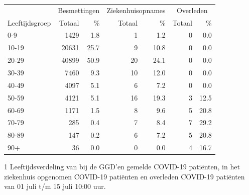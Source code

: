 \documentclass[
  english,
  man,floatsintext]{apa6}
\begin{document}
\begin{table}
\centering\begingroup\fontsize{11}{13}\selectfont

\begin{threeparttable}
\begin{tabular}{lrrrrrr}
\toprule
\multicolumn{1}{c}{ } & \multicolumn{2}{c}{Besmettingen} & \multicolumn{2}{c}{Ziekenhuisopnames} & \multicolumn{2}{c}{Overleden} \\
\cmidrule(l{3pt}r{3pt}){2-3} \cmidrule(l{3pt}r{3pt}){4-5} \cmidrule(l{3pt}r{3pt}){6-7}
Leeftijdsgroep & Totaal & \% & Totaal & \% & Totaal & \%\\
\midrule
0-9 & 1429 & 1.8 & 1 & 1.2 & 0 & 0.0\\
10-19 & 20631 & 25.7 & 9 & 10.8 & 0 & 0.0\\
20-29 & 40899 & 50.9 & 20 & 24.1 & 0 & 0.0\\
30-39 & 7460 & 9.3 & 10 & 12.0 & 0 & 0.0\\
40-49 & 4097 & 5.1 & 6 & 7.2 & 0 & 0.0\\
50-59 & 4121 & 5.1 & 16 & 19.3 & 3 & 12.5\\
60-69 & 1171 & 1.5 & 8 & 9.6 & 5 & 20.8\\
70-79 & 285 & 0.4 & 7 & 8.4 & 7 & 29.2\\
80-89 & 147 & 0.2 & 6 & 7.2 & 5 & 20.8\\
90+ & 36 & 0.0 & 0 & 0.0 & 4 & 16.7\\
\bottomrule
\end{tabular}
\begin{tablenotes}
\item[1] Leeftijdsverdeling van bij de GGD’en gemelde COVID-19 patiënten, in het ziekenhuis opgenomen COVID-19 patiënten en overleden COVID-19 patiënten van 01 juli t/m 15 juli 10:00 uur.
\end{tablenotes}
\end{threeparttable}
\endgroup{}
\end{table}

\newpage
\end{document}

